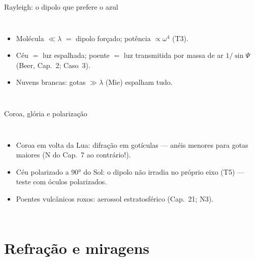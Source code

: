 \documentclass[aspectratio=169,11pt]{beamer}
\begin{document}
\begin{frame}{Rayleigh: o dipolo que prefere o azul}
  \begin{columns}
    \vspace{0.4em}
    \begin{itemize}
      \item Molécula $\ll\lambda$ $=$ dipolo forçado; potência
            $\propto\omega^4$ (T3).
      \item Céu $=$ luz espalhada; poente $=$ luz transmitida por
            massa de ar $1/\sin\Psi$ (Beer, Cap.~2; Caso~3).
      \item Nuvens brancas: gotas $\gg\lambda$ (Mie) espalham tudo.
    \end{itemize}
  \end{columns}
\end{frame}

\begin{frame}{Coroa, glória e polarização}
  \begin{columns}
    \begin{itemize}
      \item Coroa em volta da Lua: \alert{difração} em gotículas —
            anéis menores para gotas maiores (N do Cap.~7 ao
            contrário!).
      \item Céu polarizado a 90° do Sol: o dipolo não irradia no
            próprio eixo (T5) — teste com óculos polarizados.
      \item Poentes vulcânicos roxos: aerossol estratosférico
            (Cap.~21; N3).
    \end{itemize}
  \end{columns}
\end{frame}

\section{Refração e miragens}
\end{document}

